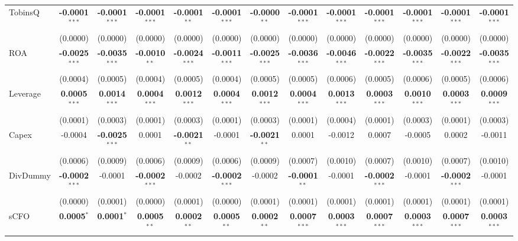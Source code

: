 \begin{landscape}
\begin{table}[H]
\begin{tabular}{lcccccccccccc}
TobinsQ & \textbf{-0.0001}$^{***}$ & \textbf{-0.0001}$^{***}$ & \textbf{-0.0001}$^{***}$ & \textbf{-0.0001}$^{**}$ & \textbf{-0.0001}$^{***}$ & \textbf{-0.0000}$^{**}$ & \textbf{-0.0001}$^{***}$ & \textbf{-0.0001}$^{***}$ & \textbf{-0.0001}$^{***}$ & \textbf{-0.0001}$^{***}$ & \textbf{-0.0001}$^{***}$ & \textbf{-0.0001}$^{***}$ \\
 & (0.0000) & (0.0000) & (0.0000) & (0.0000) & (0.0000) & (0.0000) & (0.0000) & (0.0000) & (0.0000) & (0.0000) & (0.0000) & (0.0000) \\
ROA & \textbf{-0.0025}$^{***}$ & \textbf{-0.0035}$^{***}$ & \textbf{-0.0010}$^{**}$ & \textbf{-0.0024}$^{***}$ & \textbf{-0.0011}$^{***}$ & \textbf{-0.0025}$^{***}$ & \textbf{-0.0036}$^{***}$ & \textbf{-0.0046}$^{***}$ & \textbf{-0.0022}$^{***}$ & \textbf{-0.0035}$^{***}$ & \textbf{-0.0022}$^{***}$ & \textbf{-0.0035}$^{***}$ \\
 & (0.0004) & (0.0005) & (0.0004) & (0.0005) & (0.0004) & (0.0005) & (0.0005) & (0.0006) & (0.0005) & (0.0006) & (0.0005) & (0.0006) \\
Leverage & \textbf{0.0005}$^{***}$ & \textbf{0.0014}$^{***}$ & \textbf{0.0004}$^{***}$ & \textbf{0.0012}$^{***}$ & \textbf{0.0004}$^{***}$ & \textbf{0.0012}$^{***}$ & \textbf{0.0004}$^{***}$ & \textbf{0.0013}$^{***}$ & \textbf{0.0003}$^{***}$ & \textbf{0.0010}$^{***}$ & \textbf{0.0003}$^{***}$ & \textbf{0.0009}$^{***}$ \\
 & (0.0001) & (0.0003) & (0.0001) & (0.0003) & (0.0001) & (0.0003) & (0.0001) & (0.0004) & (0.0001) & (0.0003) & (0.0001) & (0.0003) \\
Capex & -0.0004 & \textbf{-0.0025}$^{***}$ & 0.0001 & \textbf{-0.0021}$^{**}$ & -0.0001 & \textbf{-0.0021}$^{**}$ & 0.0001 & -0.0012 & 0.0007 & -0.0005 & 0.0002 & -0.0011 \\
 & (0.0006) & (0.0009) & (0.0006) & (0.0009) & (0.0006) & (0.0009) & (0.0007) & (0.0010) & (0.0007) & (0.0010) & (0.0007) & (0.0010) \\
DivDummy & \textbf{-0.0002}$^{***}$ & -0.0001 & \textbf{-0.0002}$^{***}$ & -0.0002 & \textbf{-0.0002}$^{***}$ & -0.0002 & \textbf{-0.0001}$^{**}$ & -0.0001 & \textbf{-0.0002}$^{***}$ & -0.0001 & \textbf{-0.0002}$^{***}$ & -0.0001 \\
 & (0.0000) & (0.0001) & (0.0000) & (0.0001) & (0.0000) & (0.0001) & (0.0001) & (0.0001) & (0.0001) & (0.0001) & (0.0001) & (0.0001) \\
sCFO & \textbf{0.0005}$^{*}$ & \textbf{0.0001}$^{*}$ & \textbf{0.0005}$^{**}$ & \textbf{0.0002}$^{**}$ & \textbf{0.0005}$^{**}$ & \textbf{0.0002}$^{**}$ & \textbf{0.0007}$^{***}$ & \textbf{0.0003}$^{***}$ & \textbf{0.0007}$^{***}$ & \textbf{0.0003}$^{***}$ & \textbf{0.0007}$^{***}$ & \textbf{0.0003}$^{***}$ \\

\end{tabular}
\end{table}
\end{landscape}

